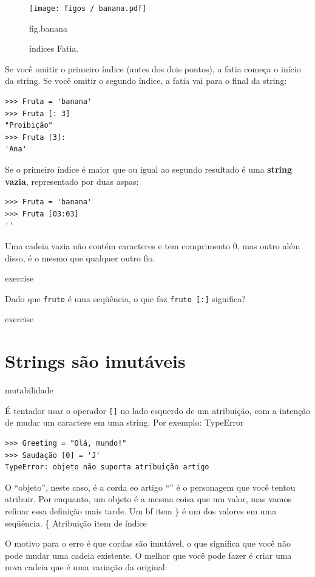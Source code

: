 \documentclass[10pt]{book}
\begin{document}
\begin{exercise}
\begin{figure}
\centerline
{\texttt{[image: figos / banana.pdf]}}
\caption{índices Fatia.}
\label{} fig.banana
\end{figure}


Se você omitir o primeiro índice (antes dos dois pontos), a fatia começa
o início da string. Se você omitir o segundo índice, a fatia
vai para o final da string:

\begin{verbatim}
>>> Fruta = 'banana'
>>> Fruta [: 3]
"Proibição"
>>> Fruta [3]:
'Ana'
\end{verbatim}
%
Se o primeiro índice é maior que ou igual ao segundo resultado
é uma {\bf string vazia}, representado por duas aspas:

\begin{verbatim}
>>> Fruta = 'banana'
>>> Fruta [03:03]
''
\end{verbatim}
%
Uma cadeia vazia não contém caracteres e tem comprimento 0, mas outro
além disso, é o mesmo que qualquer outro fio.

\begin{} exercise

Dado que {\tt fruto} é uma seqüência, o que faz
{\tt fruto [:]} significa?

\end{} exercise


\section{Strings são imutáveis}
\index{} mutabilidade

É tentador usar o operador {\tt []} no lado esquerdo de um
atribuição, com a intenção de mudar um caractere em uma string.
Por exemplo:
\index{} TypeError

\begin{verbatim}
>>> Greeting = "Olá, mundo!"
>>> Saudação [0] = 'J'
TypeError: objeto não suporta atribuição artigo
\end{verbatim}
%
O ``objeto'', neste caso, é a corda eo artigo ``'' é
o personagem que você tentou atribuir. Por enquanto, um objeto {\bf} é
a mesma coisa que um valor, mas vamos refinar essa definição
mais tarde. Um {bf item \} é um dos valores em uma seqüência.
\{} Atribuição item de índice

O motivo para o erro é que
cordas são {\bf} imutável, o que significa que você não pode mudar uma
cadeia existente. O melhor que você pode fazer é criar uma nova cadeia
que é uma variação da original:


\end{exercise}
\end{document}

